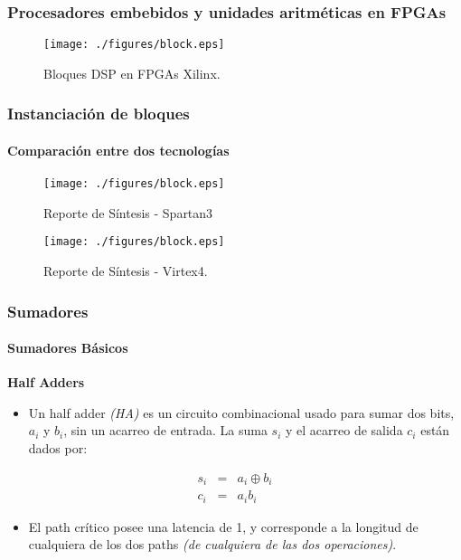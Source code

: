 \begin{frame}%
  \frametitle{\textbf{Procesadores embebidos y unidades aritméticas en FPGAs}}
  \vspace{-0.3cm}
  \begin{figure}[!t] \centering
    \texttt{[image: ./figures/block.eps]}
    \caption*{Bloques DSP en FPGAs Xilinx.}
  \end{figure}
\end{frame}

\begin{frame}%
  \frametitle{\textbf{Instanciación de bloques}}
  \framesubtitle{Comparación entre dos tecnologías}
  \vspace{-0.3cm}
  \begin{figure}[!t] \centering
    \texttt{[image: ./figures/block.eps]}
    \caption*{\centering \footnotesize Reporte de Síntesis - Spartan3}
  \end{figure}
  \vspace{-0.5cm}
  \begin{figure}[!t] \centering
				\texttt{[image: ./figures/block.eps]}
				\caption*{\centering \footnotesize Reporte de Síntesis - Virtex4.}
		\end{figure}
\end{frame}

\begin{frame}%
  \frametitle{\textbf{Sumadores}}
  \framesubtitle{Sumadores Básicos}
  \begin{block}{\textbf{Half Adders}}
    \begin{itemize} \justifying\footnotesize
    \item Un half adder \textit{(HA)} es un circuito combinacional usado para
      sumar dos bits, $a_{i}$ y $b_{i}$, sin un acarreo de entrada. La suma
      $s_{i}$ y el acarreo de salida $c_{i}$ están dados por:
    \end{itemize}
    \begin{eqnarray}
      s_{i} &=& a_{i} \oplus b_{i} \\
      c_{i} &=& a_{i}b_{i}
    \end{eqnarray}
    \begin{itemize} \justifying\footnotesize
    \item El path crítico posee una latencia de 1, y corresponde a la longitud
      de cualquiera de los dos paths \textit{(de cualquiera de las dos
        operaciones)}.
    \end{itemize}
  \end{block}
\end{frame}


